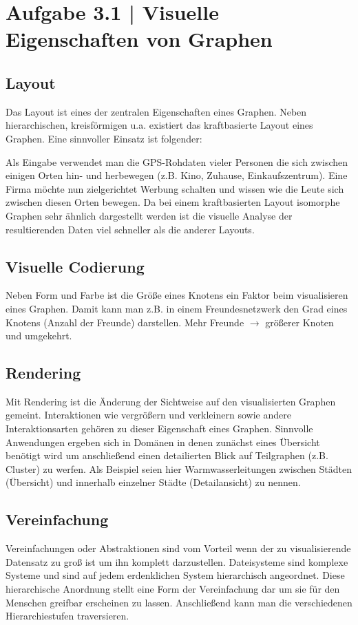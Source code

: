 \documentclass[a4paper,12pt,ngerman]{scrartcl}
\begin{document}
\pagestyle{fancy} %

\section{Aufgabe 3.1 | Visuelle Eigenschaften von Graphen}
\subsection*{Layout}
Das Layout ist eines der zentralen Eigenschaften eines Graphen. Neben hierarchischen, kreisförmigen u.a. existiert das kraftbasierte Layout eines Graphen. Eine sinnvoller Einsatz ist folgender:

Als Eingabe verwendet man die GPS-Rohdaten vieler Personen die sich zwischen einigen Orten hin- und herbewegen (z.B. Kino, Zuhause, Einkaufszentrum). Eine Firma möchte nun zielgerichtet Werbung schalten und wissen wie die Leute sich zwischen diesen Orten bewegen. Da bei einem kraftbasierten Layout isomorphe Graphen sehr ähnlich dargestellt werden ist die visuelle Analyse der resultierenden Daten viel schneller als die anderer Layouts.

\subsection*{Visuelle Codierung}
Neben Form und Farbe ist die Größe eines Knotens ein Faktor beim visualisieren eines Graphen. Damit kann man z.B. in einem Freundesnetzwerk den Grad eines Knotens (Anzahl der Freunde) darstellen. Mehr Freunde $\rightarrow$ größerer Knoten und umgekehrt.

\subsection*{Rendering}
Mit Rendering ist die Änderung der Sichtweise auf den visualisierten Graphen gemeint. Interaktionen wie vergrößern und verkleinern sowie andere Interaktionsarten gehören zu dieser Eigenschaft eines Graphen. Sinnvolle Anwendungen ergeben sich in Domänen in denen zunächst eines Übersicht benötigt wird um anschließend einen detailierten Blick auf Teilgraphen (z.B. Cluster) zu werfen. Als Beispiel seien hier Warmwasserleitungen zwischen Städten (Übersicht) und innerhalb einzelner Städte (Detailansicht) zu nennen.

\subsection*{Vereinfachung}
Vereinfachungen oder Abstraktionen sind vom Vorteil wenn der zu visualisierende Datensatz zu groß ist um ihn komplett darzustellen. Dateisysteme sind komplexe Systeme und sind auf jedem erdenklichen System hierarchisch angeordnet. Diese hierarchische Anordnung stellt eine Form der Vereinfachung dar um sie für den Menschen greifbar erscheinen zu lassen. Anschließend kann man die verschiedenen Hierarchiestufen traversieren.
\end{document}
